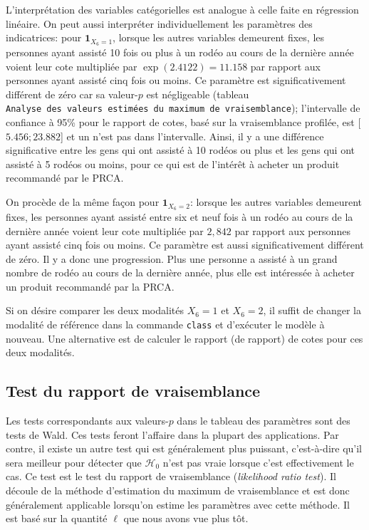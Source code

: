 \documentclass[
  11pt,
  letterpaper,
]{book}
\theoremstyle{definition}
\theoremstyle{definition}
\theoremstyle{definition}
\theoremstyle{definition}
\theoremstyle{remark}
\begin{document}
L'interprétation des variables catégorielles est analogue à celle faite en régression linéaire. On peut aussi interpréter individuellement les paramètres des indicatrices: pour \({\mathbf 1}_{X_6=1}\), lorsque les autres variables demeurent fixes, les personnes ayant assisté 10 fois ou plus à un rodéo au cours de la dernière année voient leur cote multipliée par \(\exp(2.4122)=11.158\) par rapport aux personnes ayant assisté cinq fois ou moins. Ce paramètre est significativement différent de zéro car sa valeur-\(p\) est négligeable (tableau \texttt{Analyse\ des\ valeurs\ estimées\ du\ maximum\ de\ vraisemblance}); l'intervalle de confiance à 95\% pour le rapport de cotes, basé sur la vraisemblance profilée, est {[}\(5.456; 23.882\){]} et un n'est pas dans l'intervalle. Ainsi, il y a une différence significative entre les gens qui ont assisté à 10 rodéos ou plus et les gens qui ont assisté à 5 rodéos ou moins, pour ce qui est de l'intérêt à acheter un produit recommandé par le PRCA.

On procède de la même façon pour \({\mathbf 1}_{X_6=2}\): lorsque les autres variables demeurent fixes, les personnes ayant assisté entre six et neuf fois à un rodéo au cours de la dernière année voient leur cote multipliée par \(2,842\) par rapport aux personnes ayant assisté cinq fois ou moins. Ce paramètre est aussi significativement différent de zéro. Il y a donc une progression. Plus une personne a assisté à un grand nombre de rodéo au cours de la dernière année, plus elle est intéressée à acheter un produit recommandé par la PRCA.

Si on désire comparer les deux modalités \(X_6=1\) et \(X_6=2\), il suffit de changer la modalité de référence dans la commande \texttt{class} et d'exécuter le modèle à nouveau. Une alternative est de calculer le rapport (de rapport) de cotes pour ces deux modalités.

\hypertarget{test-du-rapport-de-vraisemblance}{%
\subsection{Test du rapport de vraisemblance}\label{test-du-rapport-de-vraisemblance}}

Les tests correspondants aux valeurs-\(p\) dans le tableau des paramètres sont des tests de Wald. Ces tests feront l'affaire dans la plupart des applications. Par contre, il existe un autre test qui est généralement plus puissant, c'est-à-dire qu'il sera meilleur pour détecter que \(\mathcal{H}_0\) n'est pas vraie lorsque c'est effectivement le cas. Ce test est le test du rapport de vraisemblance (\emph{likelihood ratio test}). Il découle de la méthode d'estimation du maximum de vraisemblance et est donc généralement applicable lorsqu'on estime les paramètres avec cette méthode. Il est basé sur la quantité \(\ell\) que nous avons vue plus tôt.
\end{document}
